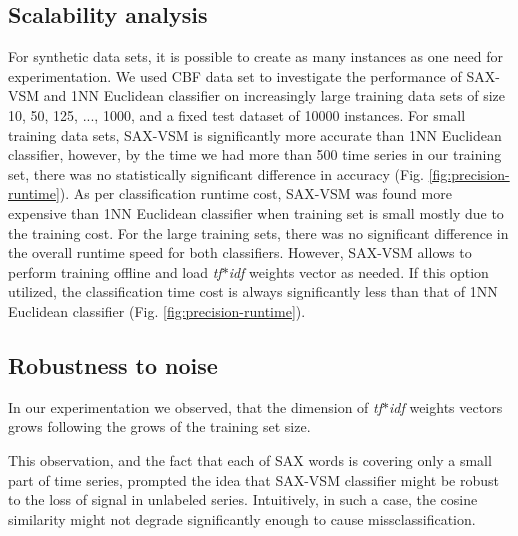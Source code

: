 \documentclass{llncs}
\begin{document}
\subsection{Scalability analysis}
For synthetic data sets, it is possible to create as many instances as one need for experimentation.
We used CBF data set \cite{cbf} to investigate the performance of SAX-VSM and 1NN Euclidean
classifier on increasingly large training data sets of size 10, 50, 125, ..., 1000, and a fixed test
dataset of 10000 instances. For small training data sets, SAX-VSM is signiﬁcantly more accurate
than 1NN Euclidean classifier, however, by the time we had more than 500 time series in
our training set, there was no statistically signiﬁcant diﬀerence in accuracy (Fig.
\ref{fig:precision-runtime}). 
As per classification runtime cost, SAX-VSM was found more expensive than 1NN Euclidean classifier
when training set is small mostly due to the training cost. For the large training sets, there was
no significant difference in the overall runtime speed for both classifiers.
However, SAX-VSM allows to perform training offline and load \textit{tf$\ast$idf} weights vector as
needed. If this option utilized, the classification time cost is always significantly less than that
of 1NN Euclidean classifier (Fig. \ref{fig:precision-runtime}).

\subsection{Robustness to noise}
In our experimentation we observed, that the dimension of \textit{tf$\ast$idf} weights vectors 
grows following the grows of the training set size. 

This observation, and the fact that each of SAX words is covering only a small part of time 
series, prompted the idea that SAX-VSM classifier might be robust to the loss of signal 
in unlabeled series. Intuitively, in such a case, the cosine similarity might not
degrade significantly enough to cause missclassification.
\end{document}
